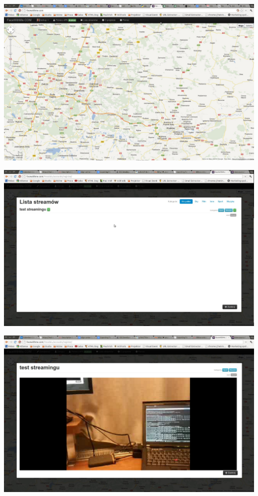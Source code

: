 \begin{center}
    \includegraphics[width=\textwidth]{img/screens/interfejs_www/interaktywna-mapa.jpg}
    \label{fig:interaktywnaMapa}
\end{center}
\begin{center}
    \includegraphics[width=\textwidth]{img/screens/interfejs_www/lista-streamow.jpg}
    \label{fig:listaStreamow}
\end{center}
\begin{center}
    \includegraphics[width=\textwidth]{img/screens/interfejs_www/browser-receiver.jpg}
    \label{fig:browserReceiver}
\end{center}



